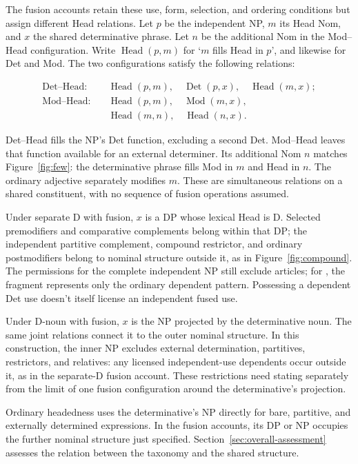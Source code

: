 \documentclass[12pt]{article}
\begin{document}
The fusion accounts retain these use, form, selection, and ordering conditions but assign different Head relations. Let $p$ be the independent NP, $m$ its Head Nom, and $x$ the shared determinative phrase. Let $n$ be the additional Nom in the Mod--Head configuration. Write $\operatorname{Head}(p,m)$ for \enquote*{$m$ fills Head in $p$}, and likewise for Det and Mod. The two configurations satisfy the following relations:

\[
\begin{aligned}
\text{Det--Head:}\quad
 &\operatorname{Head}(p,m),\quad \operatorname{Det}(p,x),\quad \operatorname{Head}(m,x); \\
\text{Mod--Head:}\quad
 &\operatorname{Head}(p,m),\quad \operatorname{Mod}(m,x),\\
 &\operatorname{Head}(m,n),\quad \operatorname{Head}(n,x).
\end{aligned}
\]

Det--Head fills the NP's Det function, excluding a second Det. Mod--Head leaves that function available for an external determiner. Its additional Nom $n$ matches Figure~\ref{fig:few}: the determinative phrase fills Mod in $m$ and Head in $n$. The ordinary adjective  separately modifies $m$. These are simultaneous relations on a shared constituent, with no sequence of fusion operations assumed.

Under separate D with fusion, $x$ is a DP whose lexical Head is D. Selected premodifiers and comparative complements belong within that DP; the independent partitive complement, compound restrictor, and ordinary postmodifiers belong to nominal structure outside it, as in Figure~\ref{fig:compound}. The permissions for the complete independent NP still exclude articles; for , the fragment represents only the ordinary dependent pattern. Possessing a dependent Det use doesn't itself license an independent fused use.

Under D-noun with fusion, $x$ is the NP projected by the determinative noun. The same joint relations connect it to the outer nominal structure. In this construction, the inner NP excludes external determination, partitives, restrictors, and relatives: any licensed independent-use dependents occur outside it, as in the separate-D fusion account. These restrictions need stating separately from the limit of one fusion configuration around the determinative's projection.

Ordinary headedness uses the determinative's NP directly for bare, partitive, and externally determined expressions. In the fusion accounts, its DP or NP occupies the further nominal structure just specified. Section~\ref{sec:overall-assessment} assesses the relation between the taxonomy and the shared structure.
\end{document}
